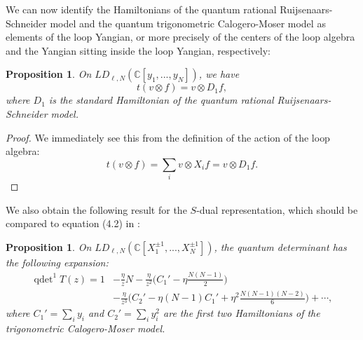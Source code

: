 \documentclass[11pt]{report}
\newtheorem{prop}[theorem]{Proposition}
\theoremstyle{definition}
\theoremstyle{remark}
\theoremstyle{remark}
\newcommand{\C}{\mathbb{C}}
\begin{document}
We can now identify the Hamiltonians of the quantum rational Ruijsenaars-Schneider model and the quantum trigonometric Calogero-Moser model as elements of the loop Yangian, or more precisely of the centers of the loop algebra and the Yangian sitting inside the loop Yangian, respectively:

\begin{prop}
On $LD_{\ell,N}(\C[y_1,...,y_N])$, we have
\begin{equation*}
t(v \otimes f) = v \otimes D_1 f,
\end{equation*}
where $D_1$ is the standard Hamiltonian of the quantum rational Ruijsenaars-Schneider model.
\end{prop}

\begin{proof}
We immediately see this from the definition of the action of the loop algebra:
\begin{equation*}
t(v \otimes f) = \sum_i v \otimes X_i f = v \otimes D_1 f.
\end{equation*}
\end{proof}

We also obtain the following result for the $S$-dual representation, which should be compared to equation (4.2) in \cite{article:bernard:1993}:

\begin{prop}
On $LD_{\ell,N}(\C[X_1^{\pm 1},...,X_N^{\pm 1}])$, the quantum determinant has the following expansion:
\begin{align*}
\operatorname{qdet}^1 T(z)
= 1 &- \frac{\eta}{z} N - \frac{\eta}{z^2} \bigg( C_1' - \eta \frac{N(N-1)}{2} \bigg) \\
&- \frac{\eta}{z^3} \bigg( C_2' - \eta (N-1) C_1' + \eta^2 \frac{N(N-1)(N-2)}{6} \bigg) + \cdots,
\end{align*}
where $C_1' = \sum_i y_i$ and $C_2' = \sum_i y_i^2$ are the first two Hamiltonians of the trigonometric Calogero-Moser model.
\end{prop}
\end{document}
